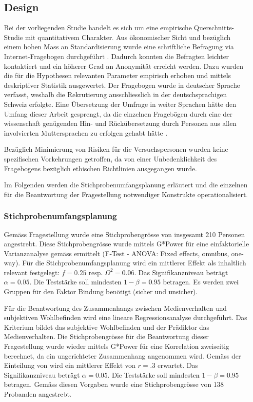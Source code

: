 \subsection{Design} \label{sec:Design}
Bei der vorliegenden Studie handelt es sich um eine empirische Querschnitts-Studie mit quantitativem Charakter. Aus ökonomischer Sicht und bezüglich einem hohen Mass an Standardisierung wurde eine schriftliche Befragung via Internet-Fragebogen durchgeführt \cite[S.~86ff]{sedlmeier2008}. Dadurch konnten die Befragten leichter kontaktiert und ein höherer Grad an Anonymität erreicht werden. Dazu wurden die für die Hypothesen relevanten Parameter empirisch erhoben und mittels deskriptiver Statistik ausgewertet. Der Fragebogen wurde in deutscher Sprache verfasst, weshalb die Rekrutierung ausschliesslich in der deutschsprachigen Schweiz erfolgte. Eine Übersetzung der Umfrage in weiter Sprachen hätte den Umfang dieser Arbeit gesprengt, da die einzelnen Fragebögen durch eine der wissenschaft genügenden Hin- und Rückübersetzung durch Personen aus allen involvierten Muttersprachen zu erfolgen gehabt hätte \cite{Pfetsch2016}.

Bezüglich Minimierung von Risiken für die Versuchspersonen wurden keine spezifischen Vorkehrungen getroffen, da von einer Unbedenklichkeit des Fragebogens bezüglich ethischen Richtlinien ausgegangen wurde.

Im Folgenden werden die Stichprobenumfangsplanung erläutert und die einzelnen für die Beantwortung der Fragestellung notwendiger Konstrukte operationalisiert.

\subsubsection{Stichprobenumfangsplanung}\label{sec:Stichprobenumfangsplanung}
Gemäss Fragestellung wurde eine Stichprobengrösse von insgesamt 210 Personen angestrebt. Diese Stichprobengrösse wurde mittels G*Power \cite{Faul2009} für eine einfaktorielle Varianzanalyse gemäss  ermittelt (F-Test - ANOVA: Fixed effects, omnibus, one-way).
Für die Stichprobenumfangsplanung wird ein mittlerer Effekt \cite{Cohen1988a} als inhaltlich relevant festgelegt: $f = 0.25$ resp. $\Omega^2 = 0.06$. Das Signifikanzniveau beträgt $\alpha=0.05$. Die Teststärke soll mindesten $1-\beta=0.95$ betragen. Es werden zwei Gruppen für den Faktor Bindung benötigt (sicher und unsicher).

Für die Beantwortung des Zusammenhangs zwischen Medienverhalten und subjektiven Wohlbefinden wird eine lineare Regressionsanalyse durchgeführt. Das Kriterium bildet das subjektive Wohlbefinden und der Prädiktor das Medienverhalten. Die Stichprobengrösse für die Beantwortung dieser Fragestellung wurde wieder mittels G*Power für eine Korrelation zweiseitig berechnet, da ein ungerichteter Zusammenhang angenommen wird. Gemäss der Einteilung von  wird ein mittlerer Effekt von $r=.3$ erwartet. Das Signifikanzniveau beträgt $\alpha=0.05$. Die Teststärke soll mindesten $1-\beta=0.95$ betragen. Gemäss diesen Vorgaben wurde eine Stichprobengrösse von 138 Probanden angestrebt.


